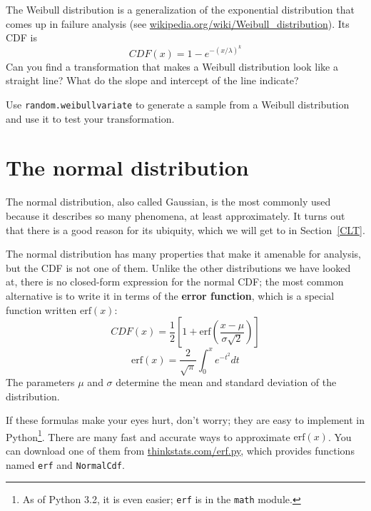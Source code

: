 \documentclass[12pt]{book}
\begin{document}
\begin{exercise}
\label{weibull}
The Weibull distribution is a generalization of the exponential
distribution that comes up in failure analysis
(see \url{wikipedia.org/wiki/Weibull_distribution}).  Its CDF is
%
\[ CDF(x) = 1 - e^{-(x / \lambda)^k} \]
%
Can you find a transformation that makes a Weibull distribution look
like a straight line?  What do the slope and intercept of the
line indicate?


Use {\tt random.weibullvariate} to generate a sample from a
Weibull distribution and use it to test your transformation.

\end{exercise}


\section{The normal distribution}
\label{normal}

\newcommand{\erf}{\mathrm{erf}}

The normal distribution, also called Gaussian, is the most commonly
used because it describes so many phenomena, at least approximately.
It turns out that there is a good reason for its ubiquity, which we
will get to in Section~\ref{CLT}.


The normal distribution has many properties that make it amenable for
analysis, but the CDF is not one of them.  Unlike the
other distributions we have looked at, there is no closed-form
expression for the normal CDF; the most common alternative is to write
it in terms of the {\bf error function}, which is a special function
written $\erf(x)$:
%
\[ CDF(x) = \frac{1}{2} \left[ 1 +
  \erf \left( \frac{x - \mu}{\sigma \sqrt{2}} \right) \right] \]
%
\[ \erf(x) = \frac{2}{\sqrt{\pi}} \int_{0}^x e^{-t^2} dt \]
%
The parameters $\mu$ and $\sigma$ determine the mean and standard
deviation of the distribution.


If these formulas make your eyes hurt, don't worry; they are easy to
implement in Python\footnote{As of Python 3.2, it is even easier; 
{\tt erf} is in the {\tt math} module.}.  There are many fast and
accurate ways to approximate $\erf(x)$.  You can download one of them
from \url{thinkstats.com/erf.py}, which provides functions named
{\tt erf} and {\tt NormalCdf}.
\end{document}
